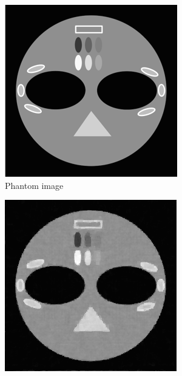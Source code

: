\begin{figure}[!htb] \centering
    \begin{subfigure}{0.45\linewidth}
        \centering
        \includegraphics[width=0.9\linewidth]{./figs/origin_img}
         \caption{Phantom image}\label{fig:pds_a}               
    \end{subfigure} %
    \quad
    \begin{subfigure}{0.45\linewidth}
        \centering
        \includegraphics[width=0.9\linewidth]{./figs/new_fig_pds_img}

\end{subfigure}
\end{figure}
